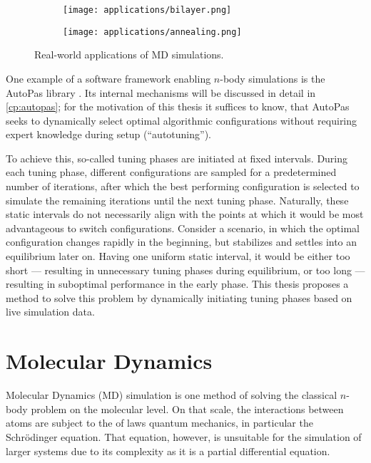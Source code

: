 \begin{figure}
	\centering
	\begin{subfigure}[t]{0.45\textwidth}
		\vskip0pt
		\centering
		\texttt{[image: applications/bilayer.png]}
	\end{subfigure}%
	\hspace{0.025\textwidth}
	\begin{subfigure}[t]{0.45\textwidth}
		\vskip0pt
		\centering
		\texttt{[image: applications/annealing.png]}
	\end{subfigure}
	\caption{Real-world applications of MD simulations.}
	\label{fig:particle_simulation_usecases}
\end{figure}

One example of a software framework enabling $n$-body simulations is the AutoPas library \cite{Gratl2019}. Its internal mechanisms will be discussed in detail in \autoref{cp:autopas}; for the motivation of this thesis it suffices to know, that AutoPas seeks to dynamically select optimal algorithmic configurations without requiring expert knowledge during setup (\enquote{autotuning}).

To achieve this, so-called tuning phases are initiated at fixed intervals. During each tuning phase, different configurations are sampled for a predetermined number of iterations, after which the best performing configuration is selected to simulate the remaining iterations until the next tuning phase. Naturally, these static intervals do not necessarily align with the points at which it would be most advantageous to switch configurations. Consider a scenario, in which the optimal configuration changes rapidly in the beginning, but stabilizes and settles into an equilibrium later on. Having one uniform static interval, it would be either too short --- resulting in unnecessary tuning phases during equilibrium, or too long --- resulting in suboptimal performance in the early phase.
This thesis proposes a method to solve this problem by dynamically initiating tuning phases based on live simulation data.


\section{Molecular Dynamics}
\label{sec:md}
Molecular Dynamics (MD) simulation is one method of solving the classical $n$-body problem on the molecular level. On that scale, the interactions between atoms are subject to the of laws quantum mechanics, in particular the Schrödinger equation. That equation, however, is unsuitable for the simulation of larger systems due to its complexity as it is a partial differential equation.

